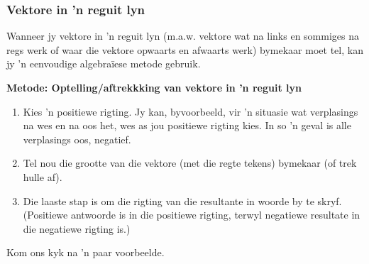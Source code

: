 \subsubsection*{Vektore in  'n reguit lyn}

Wanneer jy vektore in  'n reguit lyn (m.a.w. vektore wat na links en sommiges na regs werk of waar die vektore opwaarts en afwaarts werk) bymekaar moet tel, kan jy  'n eenvoudige algebraïese metode gebruik.\\

\begin{minipage}{\textwidth}
\textbf{Metode: Optelling/aftrekkking van vektore in  'n reguit lyn}
\begin{enumerate}[noitemsep, label=\textbf{\arabic*}.]
\item{Kies  'n positiewe rigting. Jy kan, byvoorbeeld, vir  'n situasie wat verplasings na wes en na oos het, wes as jou positiewe rigting kies. In so  'n geval is alle verplasings oos, negatief.}
\item{Tel nou die grootte van die vektore (met die regte tekens) bymekaar (of trek hulle af).}
\item{Die laaste stap is om die rigting van die resultante in woorde by te skryf. (Positiewe antwoorde is in die positiewe rigting, terwyl negatiewe resultate in die negatiewe rigting is.)}\\
\end{enumerate}
\end{minipage}

Kom ons kyk na  'n paar voorbeelde.

